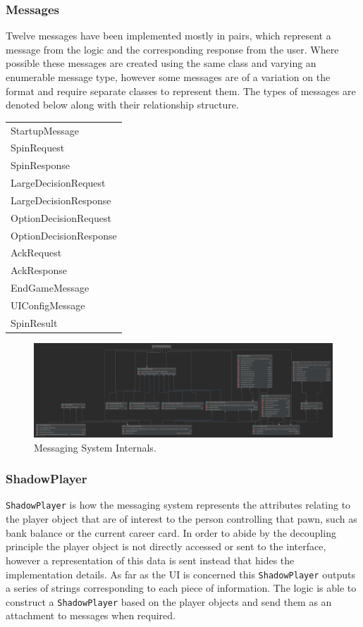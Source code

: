 \documentclass[a4paper, 11pt]{article}
\begin{document}
	\subsubsection*{Messages}
	Twelve messages have been implemented mostly in pairs, which represent a message from the logic and the corresponding response from the user. Where possible these messages are created using the same class and varying an enumerable message type, however some messages are of a variation on the format and require separate classes to represent them. The types of messages are denoted below along with their relationship structure.
	\begin{table}[!ht]
		\begin{flushleft} 
			\begin{tabular}{l} 
				StartupMessage\\
				SpinRequest\\
				SpinResponse\\
				LargeDecisionRequest\\
				LargeDecisionResponse\\
				OptionDecisionRequest\\
				OptionDecisionResponse\\
				AckRequest\\
				AckResponse\\
				EndGameMessage\\
				UIConfigMessage\\
				SpinResult\\	
			\end{tabular}
		\end{flushleft}
	\end{table}
	\begin{figure}[!h]
		\centering
		\includegraphics[scale=.125]{uml/messaging_internals_uml}
		\caption{Messaging System Internals.}
		\label{fig:messages_uml}
	\end{figure}
	\subsubsection*{ShadowPlayer}
	\texttt{ShadowPlayer} is how the messaging system represents the attributes relating to the player object that are of interest to the person controlling that pawn, such as bank balance or the current career card.
	In order to abide by the decoupling principle the player object is not directly accessed or sent to the interface, however a representation of this data is sent instead that hides the implementation details.
	As far as the UI is concerned this \texttt{ShadowPlayer} outputs a series of strings corresponding to each piece of information.
	The logic is able to construct a \texttt{ShadowPlayer} based on the player objects and send them as an attachment to messages when required.
\end{document}
